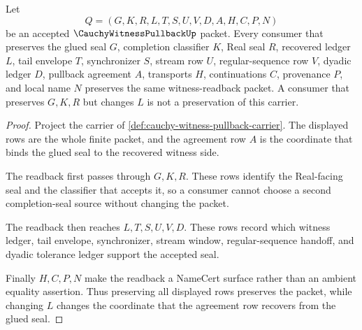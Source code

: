\begin{theorem}
\label{thm:cauchy-witness-pullback-namecert-obligations}
Let
$$
Q=(G,K,R,L,T,S,U,V,D,A,H,C,P,N)
$$
be an accepted $\CauchyWitnessPullbackUp$ packet. Every consumer that preserves the glued seal $G$, completion classifier $K$, Real seal $R$, recovered ledger $L$, tail envelope $T$, synchronizer $S$, stream row $U$, regular-sequence row $V$, dyadic ledger $D$, pullback agreement $A$, transports $H$, continuations $C$, provenance $P$, and local name $N$ preserves the same witness-readback packet. A consumer that preserves $G,K,R$ but changes $L$ is not a preservation of this carrier.
\end{theorem}
\begin{proof}
Project the carrier of \autoref{def:cauchy-witness-pullback-carrier}. The displayed rows are the whole finite packet, and the agreement row $A$ is the coordinate that binds the glued seal to the recovered witness side.

The readback first passes through $G,K,R$. These rows identify the Real-facing seal and the classifier that accepts it, so a consumer cannot choose a second completion-seal source without changing the packet.

The readback then reaches $L,T,S,U,V,D$. These rows record which witness ledger, tail envelope, synchronizer, stream window, regular-sequence handoff, and dyadic tolerance ledger support the accepted seal.

Finally $H,C,P,N$ make the readback a NameCert surface rather than an ambient equality assertion. Thus preserving all displayed rows preserves the packet, while changing $L$ changes the coordinate that the agreement row recovers from the glued seal.
\end{proof}


